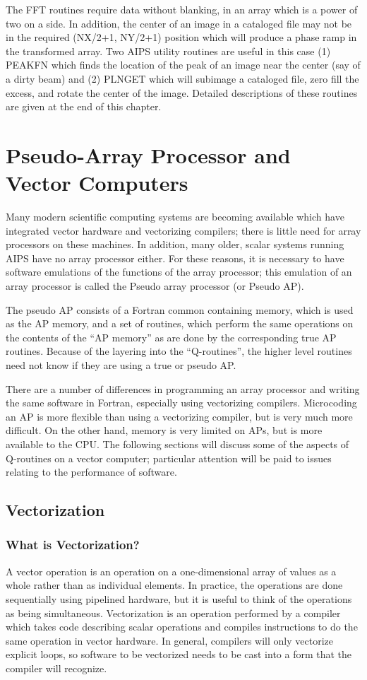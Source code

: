 The FFT routines require data without blanking, in an array which is a
power of two on a side.  In addition, the center of an image in a
cataloged file may not be in the required (NX/2+1, NY/2+1) position
which will produce a phase ramp in the transformed array. Two AIPS
utility routines are useful in this case (1) PEAKFN
which finds the location of the peak of an image near the center (say
of a dirty beam) and (2) PLNGET which will subimage a
cataloged file, zero fill the excess, and rotate the center of the
image.  Detailed descriptions of these routines are given at the end
of this chapter.

\section{Pseudo-Array Processor and Vector Computers }
Many modern scientific computing systems are becoming available which
have integrated vector hardware and vectorizing compilers; there is
little need for array processors on these machines.  In addition, many
older, scalar systems running AIPS have no array processor either. For
these reasons, it is necessary to have software emulations of the
functions of the array processor; this emulation of an array processor
is called the Pseudo array processor (or Pseudo AP).

The pseudo AP consists of a Fortran common containing memory, which is
used as the AP memory, and a set of routines, which perform the same
operations on the contents of the ``AP memory'' as are done by the
corresponding true AP routines.  Because of the layering into the
``Q-routines'', the higher level routines need not know if they are
using a true or pseudo AP.

There are a number of differences in programming an array processor
and writing the same software in Fortran, especially using vectorizing
compilers.  Microcoding an AP is more flexible than using a
vectorizing compiler, but is very much more difficult.  On the other
hand, memory is very limited on APs, but is more available to the CPU.
The following sections will discuss some of the aspects of Q-routines
on a vector computer; particular attention will be paid to issues
relating to the performance of software.

\subsection{Vectorization }
\subsubsection{What is Vectorization?}
A vector operation is an operation on a one-dimensional array of
values as a whole rather than as individual elements.  In practice,
the operations are done sequentially using pipelined hardware, but it
is useful to think of the operations as being simultaneous.
Vectorization is an operation performed by a compiler which takes code
describing scalar operations and compiles instructions to do the same
operation in vector hardware. In general, compilers will only vectorize
explicit loops, so software to be vectorized needs to be cast into a
form that the compiler will recognize.

